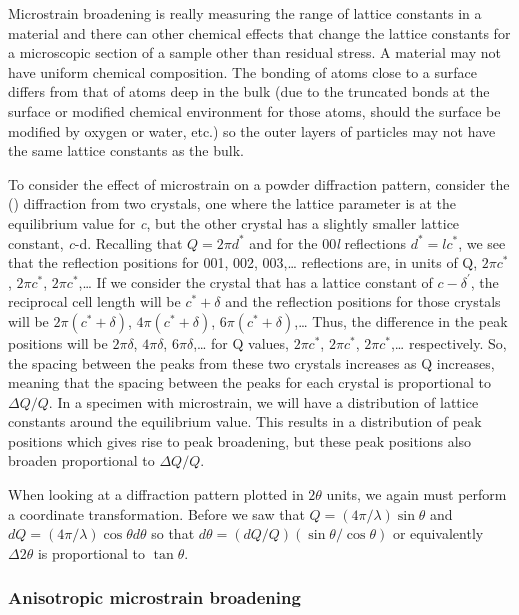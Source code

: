  Microstrain broadening is really measuring the range of lattice constants in a material and there can other chemical effects that change the lattice constants for a microscopic section of a sample other than residual stress. A material may not have uniform chemical composition. The bonding of atoms close to a surface differs from that of atoms deep in the bulk (due to the truncated bonds at the surface or modified chemical environment for those atoms, should the surface be modified by oxygen or water, etc.) so the outer layers of particles may not have the same lattice constants as the bulk. 

 To consider the effect of microstrain on a powder diffraction pattern, consider the () diffraction from two crystals, one where the lattice parameter is at the equilibrium value for \textit{c}, but the other crystal has a slightly smaller lattice constant, \textit{c}-d. Recalling that $Q=2\pi d^\ast $ and for the 00\textit{l} reflections $d^\ast = l c^\ast$, we see that the reflection positions for 001, 002, 003,… reflections are, in units of Q, $2\pi c^\ast$, $2\pi c^\ast$, $2\pi c^\ast$,… If we consider the crystal that has a lattice constant of $c-\delta^\prime$, the reciprocal cell length will be $c^\ast+\delta$ and the reflection positions for those crystals will be $2\pi (c^\ast+\delta)$, $4\pi (c^\ast+\delta)$, $6\pi (c^\ast+\delta)$,… Thus, the difference in the peak positions will be $2\pi\delta$, $4\pi\delta$, $6\pi\delta$,… for Q values, $2\pi c^\ast$, $2\pi c^\ast$, $2\pi c^\ast$,… respectively. So, the spacing between the peaks from these two crystals increases as Q increases, meaning that the spacing between the peaks for each crystal is proportional to $\Delta Q/Q$. In a specimen with microstrain, we will have a distribution of lattice constants around the equilibrium value. This results in a distribution of peak positions which gives rise to peak broadening, but these peak positions also broaden proportional to $\Delta Q/Q$. 

 When looking at a diffraction pattern plotted in $2\theta$ units, we again must perform a coordinate transformation. Before we saw that $Q = (4\pi/\lambda) \sin\theta$ and $dQ = (4\pi/\lambda) \cos\theta d\theta$ so that $d\theta = (dQ/Q) (\sin\theta / \cos\theta)$ or equivalently $\Delta 2\theta$ is proportional to $\tan\theta$.

\subsubsection{Anisotropic microstrain broadening}


